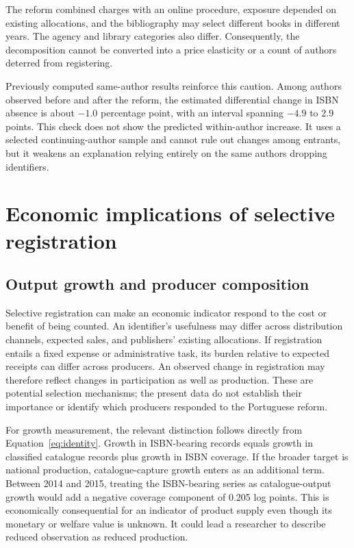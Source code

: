 \documentclass[11pt]{article}
\begin{document}
The reform combined charges with an online procedure, exposure depended on existing allocations, and the bibliography may select different books in different years. The agency and library categories also differ. Consequently, the decomposition cannot be converted into a price elasticity or a count of authors deterred from registering.

Previously computed same-author results reinforce this caution. Among authors observed before and after the reform, the estimated differential change in ISBN absence is about $-1.0$ percentage point, with an interval spanning $-4.9$ to $2.9$ points. This check does not show the predicted within-author increase. It uses a selected continuing-author sample and cannot rule out changes among entrants, but it weakens an explanation relying entirely on the same authors dropping identifiers.

\section{Economic implications of selective registration}\label{sec:economic}

\subsection{Output growth and producer composition}

Selective registration can make an economic indicator respond to the cost or benefit of being counted. An identifier's usefulness may differ across distribution channels, expected sales, and publishers' existing allocations. If registration entails a fixed expense or administrative task, its burden relative to expected receipts can differ across producers. An observed change in registration may therefore reflect changes in participation as well as production. These are potential selection mechanisms; the present data do not establish their importance or identify which producers responded to the Portuguese reform.

For growth measurement, the relevant distinction follows directly from Equation~\ref{eq:identity}. Growth in ISBN-bearing records equals growth in classified catalogue records plus growth in ISBN coverage. If the broader target is national production, catalogue-capture growth enters as an additional term. Between 2014 and 2015, treating the ISBN-bearing series as catalogue-output growth would add a negative coverage component of 0.205 log points. This is economically consequential for an indicator of product supply even though its monetary or welfare value is unknown. It could lead a researcher to describe reduced observation as reduced production.
\end{document}
